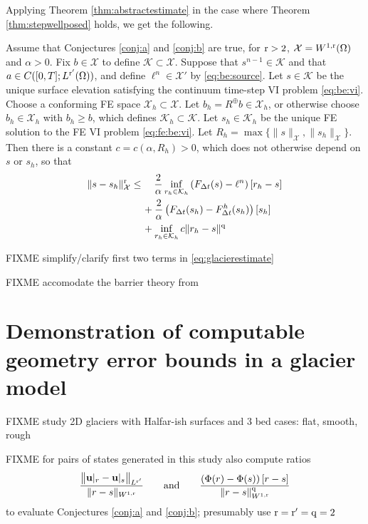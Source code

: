 \documentclass[hidelinks,onefignum,onetabnum,final]{siamart220329}  %
\newcommand{\bu}{\mathbf{u}}
\newcommand{\cK}{\mathcal{K}}
\newcommand{\cX}{\mathcal{X}}
\newcommand{\qq}{{\text{\textnormal{q}}}}
\newcommand{\rr}{{\text{\textnormal{r}}}}
\begin{document}
Applying Theorem \ref{thm:abstractestimate} in the case where Theorem \ref{thm:stepwellposed} holds, we get the following.

\begin{theorem} \label{thm:glacierapplication}  Assume that Conjectures \ref{conj:a} and \ref{conj:b} are true, for $\rr>2$, $\cX=W^{1,\rr}(\Omega)$ and $\alpha>0$.  Fix $b \in \cX$ to define $\cK\subset\cX$.  Suppose that $s^{n-1}\in\cK$ and that $a\in C([0,T]; L^{\rr'}(\Omega))$, and define $\ell^n \in \cX'$ by \eqref{eq:be:source}.  Let $s\in\cK$ be the unique surface elevation satisfying the continuum time-step VI problem \eqref{eq:be:vi}.  Choose a conforming FE space $\cX_h \subset \cX$.  Let $b_h = R^\oplus b \in \cX_h$, or otherwise choose $b_h\in\cX_h$ with $b_h\ge b$, which defines $\cK_h\subset \cK$.  Let $s_h\in\cK_h$ be the unique FE solution to the FE VI problem \eqref{eq:fe:be:vi}.  Let $R_h=\max\{\|s\|_\cX,\|s_h\|_\cX\}$.  Then there is a constant $c=c(\alpha,R_h)>0$, which does not otherwise depend on $s$ or $s_h$, so that
\begin{align}
\|s-s_h\|_\cX^\rr &\le \quad \frac{2}{\alpha} \inf_{r_h\in\cK_h} \left(F_{\Delta t}(s)-\ell^n\right)[r_h-s] \label{eq:glacierestimate} \\
   &\quad\, + \frac{2}{\alpha} \left(F_{\Delta t}(s_h)-F^h_{\Delta t}(s_h)\right)[s_h] \notag \\
   &\quad\, + \inf_{r_h\in\cK_h} c \|r_h - s\|^\qq \notag
\end{align}
\end{theorem}

FIXME simplify/clarify first two terms in \eqref{eq:glacierestimate}

FIXME accomodate the barrier theory from \cite{Bueler2021conservation}


\section{Demonstration of computable geometry error bounds in a glacier model} \label{sec:demo}

FIXME study 2D glaciers with Halfar-ish surfaces and 3 bed cases: flat, smooth, rough

FIXME for pairs of states generated in this study also compute ratios
\begin{equation}
\frac{\big\|\bu|_r - \bu|_s\big\|_{L^{\rr'}}}{\|r-s\|_{W^{1,\rr}}} \qquad \text{and} \qquad \frac{\left(\Phi(r) - \Phi(s)\right)[r-s]}{\|r-s\|_{W^{1,\rr}}^\qq}
\end{equation}
to evaluate Conjectures \ref{conj:a} and \ref{conj:b}; presumably use $\rr=\rr'=\qq=2$
\end{document}
